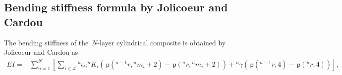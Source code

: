 \documentclass[preprint,10pt,times]{elsarticle}
\numberwithin{equation}{section}
\newcommand{\pr}[1]{\left( #1 \right)}
\newcommand{\p}{\,\mathsf{p}}
\renewcommand{\>}{$\Rightarrow$}
\begin{document}
\subsection{Bending stiffness formula by Jolicoeur and Cardou}
\label{sec:bending stiffness}
The bending stiffness of the~$N$-layer cylindrical composite is obtained by Jolicoeur and Cardou as
\begin{equation}
	\begin{aligned}
	EI = & \sum_{n=1}^{N} \left[ \sum_{i \in \mathcal{L}} {}^{n}\!{\alpha_{i}} {}^{n}\!{K_{i}}  \pr{\p\pr{{}^{n-1}\!{r},{}^{n}\!{m_{i}}+2} - \p\pr{{}^{n}\!{r},{}^{n}\!{m_{i}} + 2}} + {}^{n}\!\gamma\pr{\p\pr{{}^{n-1}\!{r},4} - \p\pr{{}^{n}\!{r},4}} \right],
	\end{aligned}
	\label{eq:EI}
\end{equation}
\end{document}
